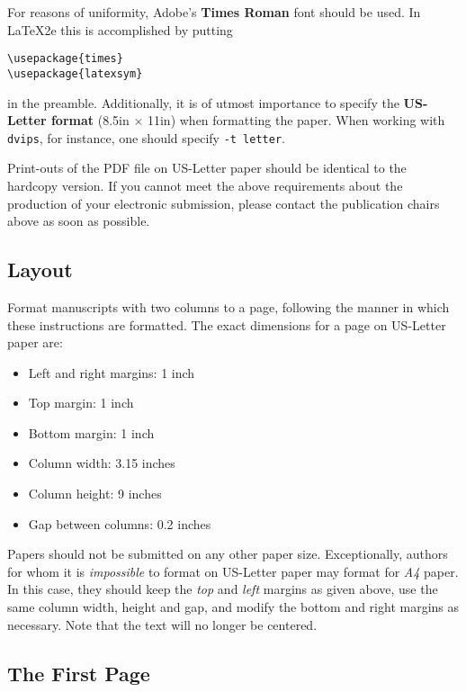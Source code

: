 \documentclass[11pt,letterpaper]{article}
\begin{document}
For reasons of uniformity, Adobe's {\bf Times Roman} font should be
used. In \LaTeX2e{} this is accomplished by putting
\small
\begin{verbatim}
\usepackage{times}
\usepackage{latexsym}
\end{verbatim}
\normalsize
in the preamble.
Additionally, it is of utmost importance to specify the {\bf US-Letter
format} (8.5in $\times$ 11in) when formatting the paper. When working with
{\small\tt dvips}, for instance, one should specify {\small\tt -t letter}.

Print-outs of the PDF file on US-Letter paper should be identical to the
hardcopy version.  If you cannot meet the above requirements about the
production of your electronic submission, please contact the
publication chairs above  as soon as possible.

\subsection{Layout}
\label{ssec-emnlp2016:layout}

Format manuscripts with two columns to a page, following the manner in
which these instructions are formatted. The exact dimensions for a page
on US-Letter paper are:

\begin{itemize}
\item Left and right margins: 1 inch
\item Top margin: 1 inch
\item Bottom margin: 1 inch
\item Column width: 3.15 inches
\item Column height: 9 inches
\item Gap between columns: 0.2 inches
\end{itemize}

\noindent Papers should not be submitted on any other paper size.
Exceptionally, authors for whom it is \emph{impossible} to format on
US-Letter paper may format for \emph{A4} paper. In this case, they should
keep the \emph{top} and \emph{left} margins as given above, use the same
column width, height and gap, and modify the bottom and right margins as
necessary. Note that the text will no longer be centered.

\subsection{The First Page}
\label{ssec-emnlp2016:first}
\end{document}
